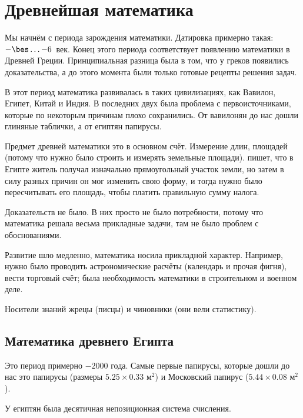 \documentclass[a4paper,oneside,fleqn,10pt]{article}
\newcommand{\pe}[2]{${#1}\ldots{#2}$}
\begin{document}


\section{Древнейшая математика}

Мы начнём с периода зарождения математики. Датировка примерно такая:
\pe{-\bes}{-6}~век. Конец этого периода соответствует появлению
математики в Древней Греции. Принципиальная разница была в том,
что у греков появились доказательства, а до этого момента были только
готовые рецепты решения задач.

В этот период математика развивалась в таких цивилизациях, как Вавилон, Египет,
Китай и Индия. В последних двух была проблема с первоисточниками,
которые по некоторым причинам плохо сохранились.
От вавилонян до нас дошли глиняные таблички, а от египтян папирусы.

Предмет древней математики это в основном счёт. Измерение длин, площадей (потому что
нужно было строить и измерять земельные площади).  пишет, что в Египте
житель получал изначально прямоугольный участок земли, но затем в силу разных
причин он мог изменить свою форму, и тогда нужно было пересчитывать его площадь,
чтобы платить правильную сумму налога.

Доказательств не было. В них просто не было потребности, потому что
математика решала весьма прикладные задачи, там не было проблем
с обоснованиями.

Развитие шло медленно, математика носила прикладной характер.
Например, нужно было проводить астрономические расчёты (календарь и прочая фигня),
вести торговый счёт; была необходимость математики в строительном и военном деле.

Носители знаний жрецы (писцы) и чиновники (они вели статистику).


\subsection{Математика древнего Египта}

Это период примерно $-2000$ года. Самые первые папирусы,
которые дошли до нас это папирусы  (размеры $5.25 \times 0.33$ м$^2$)
и Московский папирус ($5.44 \times 0.08$ м$^2$).

У египтян была десятичная непозиционная система счисления.
\end{document}
